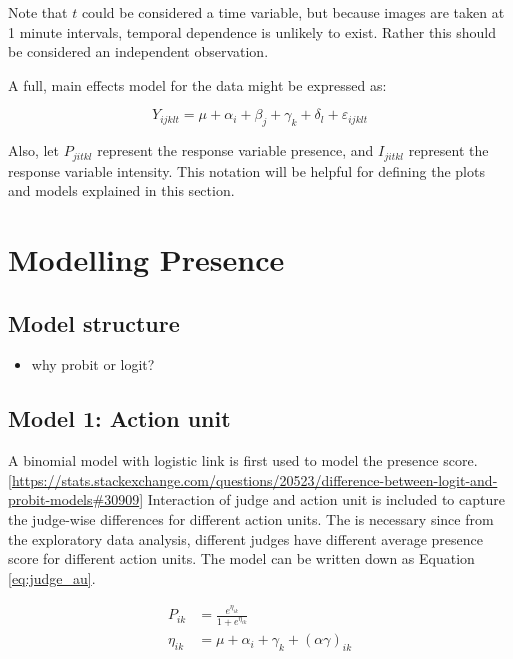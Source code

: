 \documentclass{monashthesis}
\begin{document}
Note that \(t\) could be considered a time variable, but because images are taken at 1 minute intervals, temporal dependence is unlikely to exist. Rather this should be considered an independent observation.

A full, main effects model for the data might be expressed as:

\[Y_{ijklt} = \mu + \alpha_i + \beta_j + \gamma_k + \delta_l + \varepsilon_{ijklt}\]

\noindent Also, let \(P_{jitkl}\) represent the response variable presence, and \(I_{jitkl}\) represent the response variable intensity. This notation will be helpful for defining the plots and models explained in this section.

\hypertarget{modelling-presence}{%
\section{Modelling Presence}\label{modelling-presence}}

\hypertarget{model-structure}{%
\subsection{Model structure}\label{model-structure}}

\begin{itemize}
\tightlist
\item
  why probit or logit?
\end{itemize}

\hypertarget{model-1-action-unit}{%
\subsection{Model 1: Action unit}\label{model-1-action-unit}}

A binomial model with logistic link is first used to model the presence score.{[}\url{https://stats.stackexchange.com/questions/20523/difference-between-logit-and-probit-models\#30909}{]} Interaction of judge and action unit is included to capture the judge-wise differences for different action units. The is necessary since from the exploratory data analysis, different judges have different average presence score for different action units. The model can be written down as Equation \ref{eq:judge_au}.

\begin{align}\label{eq:judge_au}
P_{ik} &= \frac{e^{\eta_{ik}}}{1 + e^{\eta_{ik}}} \\
\eta_{ik} &= \mu + \alpha_i + \gamma_k + (\alpha\gamma)_{ik}
\end{align}
\end{document}
